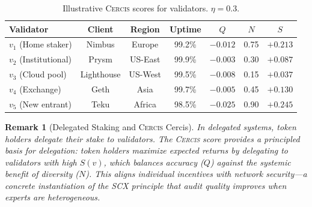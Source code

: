 \documentclass[11pt,a4paper]{article}
\newtheorem{remark}[theorem]{Remark}
\theoremstyle{definition}
\newcommand{\Cercis}{\textsc{Cercis}}
\newcommand{\SCX}{\textsc{SCX}}
\newcommand{\PoS}{\mathrm{PoS}}
\begin{document}
\begin{table}[htbp]
\centering
\caption{Illustrative \Cercis{} scores for validators. $\eta = 0.3$.}
\label{tab:cercis_validators}
\begin{tabular}{lcccccc}
\toprule
\textbf{Validator} & \textbf{Client} & \textbf{Region} & \textbf{Uptime} & $Q$ & $N$ & $S$ \\
\midrule
$v_1$ (Home staker) & Nimbus & Europe & 99.2\% & $-0.012$ & 0.75 & $+0.213$ \\
$v_2$ (Institutional) & Prysm & US-East & 99.9\% & $-0.003$ & 0.30 & $+0.087$ \\
$v_3$ (Cloud pool) & Lighthouse & US-West & 99.5\% & $-0.008$ & 0.15 & $+0.037$ \\
$v_4$ (Exchange) & Geth & Asia & 99.7\% & $-0.005$ & 0.45 & $+0.130$ \\
$v_5$ (New entrant) & Teku & Africa & 98.5\% & $-0.025$ & 0.90 & $+0.245$ \\
\bottomrule
\end{tabular}
\end{table}
\begin{remark}[Delegated Staking and \Cercis{} Cercis]
\label{rem:delegated_staking}
In delegated \PoS{} systems, token holders delegate their stake to validators. The \Cercis{} score provides a principled basis for delegation: token holders maximize expected returns by delegating to validators with high $S(v)$, which balances accuracy ($Q$) against the systemic benefit of diversity ($N$). This aligns individual incentives with network security—a concrete instantiation of the \SCX{} principle that audit quality improves when experts are heterogeneous.
\end{remark}
\end{document}
